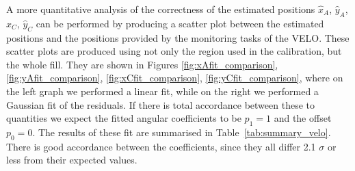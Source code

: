 A more quantitative analysis of the correctness of the estimated positions $\hat{x}_A$, $\hat{y}_{A}$, $\hat{x}_C$, $\hat{y}_C$ can be performed by producing a scatter plot between the estimated positions and the positions provided by the monitoring tasks of the VELO. These scatter plots are produced using not only the region used in the calibration, but the whole fill. They are shown in Figures \ref{fig:xAfit_comparison}, \ref{fig:yAfit_comparison}, \ref{fig:xCfit_comparison}, \ref{fig:yCfit_comparison}, where on the left graph we performed a linear fit, while on the right we performed a Gaussian fit of the residuals. If there is total accordance between these to quantities we expect the fitted angular coefficients to be $p_1=1$ and the offset $p_0=0$. 
The results of these fit are summarised in Table~\ref{tab:summary_velo}. There is good accordance between the coefficients, since they all differ 2.1 $\sigma$ or less from their expected values. 


